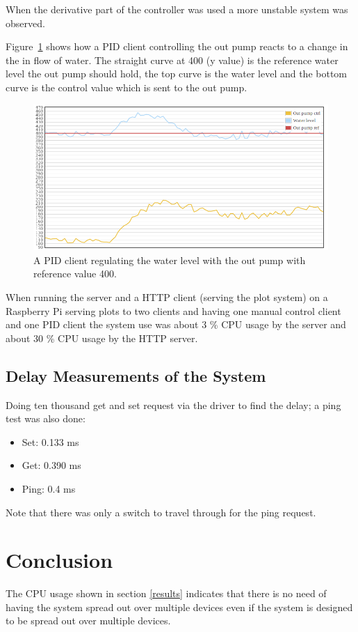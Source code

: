 \documentclass{article}
\begin{document}
When the derivative part of the controller was used a more unstable system  was
observed.

Figure~\ref{fig:out pump} shows how a PID client controlling the out pump reacts
to a change in the in flow of water. The straight curve at 400 (y value) is the
reference water level the out pump should hold, the top curve is the water level
and the bottom curve is the control value which is sent to the out pump.

\begin{figure}[H]
\includegraphics[width=1.0\textwidth]{plot1.png}
\caption{A PID client regulating the water level with the out pump with reference value 400.}
\label{fig:out pump}
\end{figure}

When running the server and a HTTP client (serving the plot system) on a
Raspberry Pi serving plots to two clients and having one manual control client
and one PID client the system use was about 3 \% CPU usage by the server and 
about 30 \% CPU usage by the HTTP server.


\subsection{Delay Measurements of the System}
Doing ten thousand get and set request via the driver to find the delay; a ping test was also done: 
\begin{itemize}
\item{Set: 0.133 ms}
\item{Get: 0.390 ms}
\item{Ping: 0.4 ms} 
\end{itemize}

Note that there was only a switch to travel through for the ping request.


\section{Conclusion}
The CPU usage shown in section \ref{results} indicates that there is no need of having
the system spread out over multiple devices even if the system is designed to be spread out over
multiple devices.
\end{document}

